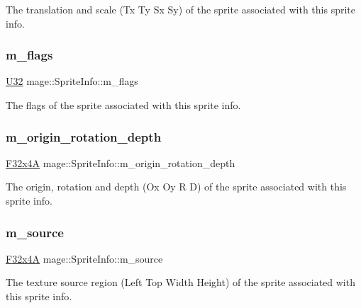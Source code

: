 The translation and scale (Tx Ty Sx Sy) of the sprite associated with this sprite info. \hypertarget{structmage_1_1_sprite_info_a9f3802944651a58e02831e5f2cb4a53e}{}\label{structmage_1_1_sprite_info_a9f3802944651a58e02831e5f2cb4a53e} 
\subsubsection{\texorpdfstring{m\+\_\+flags}{m\_flags}}
{\footnotesize\ttfamily \hyperlink{namespacemage_a41c104c036fba3756a74e19f793eeaa1}{U32} mage\+::\+Sprite\+Info\+::m\+\_\+flags}

The flags of the sprite associated with this sprite info. \hypertarget{structmage_1_1_sprite_info_aea7fe05a8be92e45134bae349986c032}{}\label{structmage_1_1_sprite_info_aea7fe05a8be92e45134bae349986c032} 
\subsubsection{\texorpdfstring{m\+\_\+origin\+\_\+rotation\+\_\+depth}{m\_origin\_rotation\_depth}}
{\footnotesize\ttfamily \hyperlink{namespacemage_a0b6ac82244eb3edc5eb66c88a3ddef13}{F32x4A} mage\+::\+Sprite\+Info\+::m\+\_\+origin\+\_\+rotation\+\_\+depth}

The origin, rotation and depth (Ox Oy R D) of the sprite associated with this sprite info. \hypertarget{structmage_1_1_sprite_info_a9b9a0885e4c0927ab0310b810a5d2306}{}\label{structmage_1_1_sprite_info_a9b9a0885e4c0927ab0310b810a5d2306} 
\subsubsection{\texorpdfstring{m\+\_\+source}{m\_source}}
{\footnotesize\ttfamily \hyperlink{namespacemage_a0b6ac82244eb3edc5eb66c88a3ddef13}{F32x4A} mage\+::\+Sprite\+Info\+::m\+\_\+source}

The texture source region (Left Top Width Height) of the sprite associated with this sprite info. \hypertarget{structmage_1_1_sprite_info_aea9963f991406a050bc5759fb05cfd5e}{}\label{structmage_1_1_sprite_info_aea9963f991406a050bc5759fb05cfd5e} 
